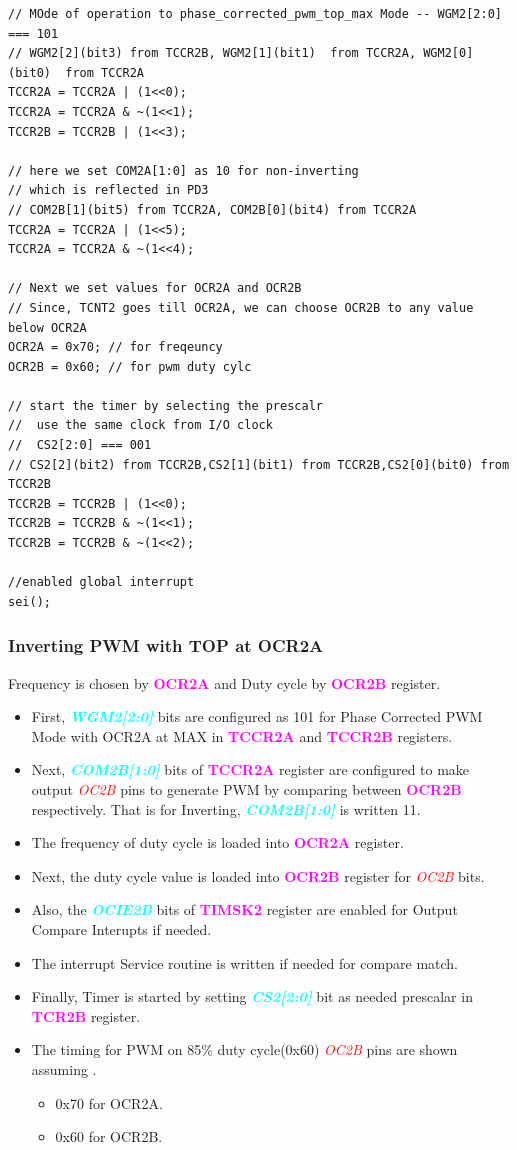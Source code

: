 \documentclass{article}
\newcommand{\bitFormat}[1]{\emph{\textbf{\textcolor{cyan}{#1}}}}
\newcommand{\regFormat}[1]{\textbf{\textcolor{magenta}{#1}}}
\newcommand{\pinFormat}[1]{\emph{\textcolor{red}{#1}}}
\begin{document}
\begin{verbatim}
// MOde of operation to phase_corrected_pwm_top_max Mode -- WGM2[2:0] === 101
// WGM2[2](bit3) from TCCR2B, WGM2[1](bit1)  from TCCR2A, WGM2[0](bit0)  from TCCR2A
TCCR2A = TCCR2A | (1<<0);
TCCR2A = TCCR2A & ~(1<<1);
TCCR2B = TCCR2B | (1<<3);		

// here we set COM2A[1:0] as 10 for non-inverting
// which is reflected in PD3
// COM2B[1](bit5) from TCCR2A, COM2B[0](bit4) from TCCR2A
TCCR2A = TCCR2A | (1<<5);
TCCR2A = TCCR2A & ~(1<<4);
    
// Next we set values for OCR2A and OCR2B
// Since, TCNT2 goes till OCR2A, we can choose OCR2B to any value below OCR2A
OCR2A = 0x70; // for freqeuncy
OCR2B = 0x60; // for pwm duty cylc

// start the timer by selecting the prescalr
//  use the same clock from I/O clock
//  CS2[2:0] === 001
// CS2[2](bit2) from TCCR2B,CS2[1](bit1) from TCCR2B,CS2[0](bit0) from TCCR2B
TCCR2B = TCCR2B | (1<<0);
TCCR2B = TCCR2B & ~(1<<1);
TCCR2B = TCCR2B & ~(1<<2);

//enabled global interrupt
sei();
\end{verbatim}

\subsubsection{Inverting PWM with TOP at  OCR2A}
\quad Frequency is chosen by \regFormat{OCR2A} and Duty cycle by \regFormat{OCR2B} register.
\begin{itemize}
    \item First, \bitFormat{WGM2[2:0]} bits are configured as 101 for Phase Corrected PWM Mode with OCR2A at MAX in \regFormat{TCCR2A} and \regFormat{TCCR2B} registers.
    \item Next,  \bitFormat{COM2B[1:0]} bits of \regFormat{TCCR2A} register are configured to make output \pinFormat{OC2B} pins to generate PWM by comparing between \regFormat{OCR2B} respectively. That is for Inverting, \bitFormat{COM2B[1:0]} is written 11.
    \item The frequency of duty cycle is loaded into \regFormat{OCR2A} register.
    \item Next, the duty cycle value is loaded into \regFormat{OCR2B} register for \pinFormat{OC2B} bits.
    \item Also, the \bitFormat{OCIE2B} bits of \regFormat{TIMSK2} register  are enabled for Output Compare Interupts if needed.
    \item The interrupt Service routine is written if needed for compare match.
    \item Finally, Timer is started by setting \bitFormat{CS2[2:0]} bit as needed prescalar in \regFormat{TCR2B} register.
    \item The timing for PWM on 85\% duty cycle(0x60)  \pinFormat{OC2B} pins are shown assuming .
    \begin{itemize}
        \item 0x70 for OCR2A.
        \item 0x60 for OCR2B.
    \end{itemize}
\end{itemize}
\end{document}
